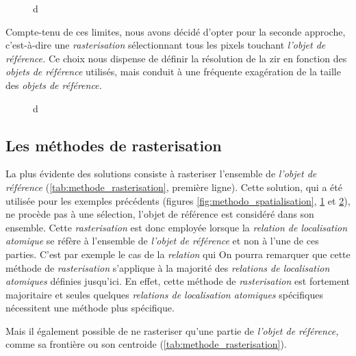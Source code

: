 \begin{figure}
  \centering
  
  \caption{d}
  \label{fig:rasterisation_sel_pixels}
\end{figure}

Compte-tenu de ces limites, nous avons décidé d'opter pour la seconde approche, c'est-à-dire une \emph{rasterisation} sélectionnant tous les pixels touchant \emph{l'objet de référence.} Ce choix nous dispense de définir la résolution de la \ac{zir} en fonction des \emph{objets de référence} utilisés, mais conduit à une fréquente exagération de la taille des \emph{objets de référence.}

\begin{figure}
  \centering
  
  \caption{d}
  \label{fig:rasterisation_cas_limite}
\end{figure}

\subsection{Les méthodes de rasterisation}



La plus évidente des solutions consiste à rasteriser l'ensemble de \emph{l'objet de référence} (\autoref{tab:methode_rasterisation}, première ligne). Cette solution, qui a été utilisée pour les exemples précédents (\ie figures \ref{fig:methodo_spatialisation}, \ref{fig:rasterisation_sel_pixels} et \ref{fig:rasterisation_cas_limite}), ne procède pas à une sélection, l'objet de référence est considéré dans son ensemble.
%
Cette \emph{rasterisation} est donc employée lorsque la \emph{relation de localisation atomique} se réfère  à l'ensemble de \emph{l'objet de référence} et non à l'une de ces parties. C'est par exemple le cas de la \emph{relation}  qui
%
On pourra remarquer que cette méthode de \emph{rasterisation} s'applique à la majorité des \emph{relations de localisation atomiques} définies jusqu'ici. En effet, cette méthode de \emph{rasterisation} est fortement majoritaire et seules quelques \emph{relations de localisation atomiques} spécifiques nécessitent une méthode plus spécifique.




Mais il également possible de ne rasteriser qu'une partie de
\emph{l'objet de référence,} comme sa frontière ou son centroide
(\autoref{tab:methode_rasterisation}).


